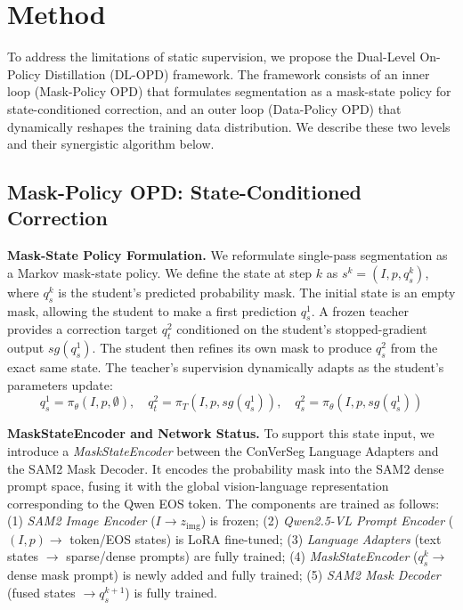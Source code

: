 \section{Method}
\label{sec:method}

To address the limitations of static supervision, we propose the Dual-Level On-Policy Distillation (DL-OPD) framework. The framework consists of an inner loop (Mask-Policy OPD) that formulates segmentation as a mask-state policy for state-conditioned correction, and an outer loop (Data-Policy OPD) that dynamically reshapes the training data distribution. We describe these two levels and their synergistic algorithm below.

\subsection{Mask-Policy OPD: State-Conditioned Correction}
\label{subsec:mask_opd}

\noindent\textbf{Mask-State Policy Formulation.} We reformulate single-pass segmentation as a Markov mask-state policy. We define the state at step $k$ as $s^k=(I,p,q_s^k)$, where $q_s^k$ is the student's predicted probability mask. The initial state is an empty mask, allowing the student to make a first prediction $q_s^1$. A frozen teacher provides a correction target $q_t^2$ conditioned on the student's stopped-gradient output $sg(q_s^1)$. The student then refines its own mask to produce $q_s^2$ from the exact same state. The teacher's supervision dynamically adapts as the student's parameters update:
\begin{equation}
    q_s^1 = \pi_\theta(I,p,\emptyset), \quad q_t^2 = \pi_T(I,p,sg(q_s^1)), \quad q_s^2 = \pi_\theta(I,p,sg(q_s^1))
\label{eq:markov_state}
\end{equation}

\noindent\textbf{MaskStateEncoder and Network Status.} To support this state input, we introduce a \textit{MaskStateEncoder} between the ConVerSeg Language Adapters and the SAM2 Mask Decoder. It encodes the probability mask into the SAM2 dense prompt space, fusing it with the global vision-language representation corresponding to the Qwen EOS token. The components are trained as follows: (1) \textit{SAM2 Image Encoder} ($I \rightarrow z_{\mathrm{img}}$) is frozen; (2) \textit{Qwen2.5-VL Prompt Encoder} ($(I,p) \rightarrow$ token/EOS states) is LoRA fine-tuned; (3) \textit{Language Adapters} (text states $\rightarrow$ sparse/dense prompts) are fully trained; (4) \textit{MaskStateEncoder} ($q_s^k \rightarrow$ dense mask prompt) is newly added and fully trained; (5) \textit{SAM2 Mask Decoder} (fused states $\rightarrow q_s^{k+1}$) is fully trained.

